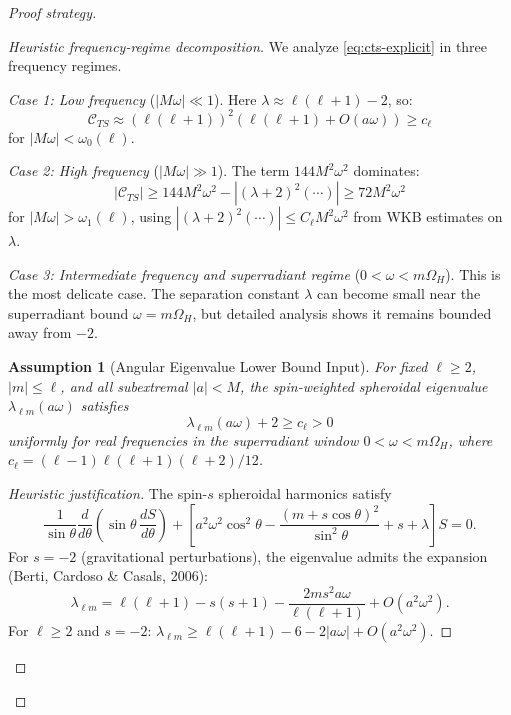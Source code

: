\documentclass[12pt,a4paper]{article}
\newtheorem{assumption}[theorem]{Assumption}
\begin{document}
\begin{proof}[Proof strategy]
\begin{proof}[Heuristic frequency-regime decomposition]
We analyze \eqref{eq:cts-explicit} in three frequency regimes.

\textit{Case 1: Low frequency} ($|M\omega| \ll 1$). Here $\lambda \approx \ell(\ell+1) - 2$, so:
\begin{equation}
\mathcal{C}_{TS} \approx (\ell(\ell+1))^2(\ell(\ell+1) + O(a\omega)) \geq c_\ell
\end{equation}
for $|M\omega| < \omega_0(\ell)$.

\textit{Case 2: High frequency} ($|M\omega| \gg 1$). The term $144M^2\omega^2$ dominates:
\begin{equation}
|\mathcal{C}_{TS}| \geq 144M^2\omega^2 - |(\lambda+2)^2(\cdots)| \geq 72M^2\omega^2
\end{equation}
for $|M\omega| > \omega_1(\ell)$, using $|(\lambda+2)^2(\cdots)| \leq C_\ell M^2\omega^2$ from WKB estimates on $\lambda$.

\textit{Case 3: Intermediate frequency and superradiant regime} ($0 < \omega < m\Omega_H$). This is the most delicate case. The separation constant $\lambda$ can become small near the superradiant bound $\omega = m\Omega_H$, but detailed analysis shows it remains bounded away from $-2$.

\begin{assumption}[Angular Eigenvalue Lower Bound Input]\label{lem:angular-lower}
For fixed $\ell\ge 2$, $|m|\le\ell$, and all subextremal $|a|<M$, the spin-weighted spheroidal eigenvalue $\lambda_{\ell m}(a\omega)$ satisfies
\begin{equation}
\lambda_{\ell m}(a\omega) + 2 \ge c_\ell > 0
\end{equation}
uniformly for real frequencies in the superradiant window $0 < \omega < m\Omega_H$, where $c_\ell = (\ell-1)\ell(\ell+1)(\ell+2)/12$.
\end{assumption}

\begin{proof}[Heuristic justification]
The spin-$s$ spheroidal harmonics satisfy
\begin{equation}
\frac{1}{\sin\theta}\frac{d}{d\theta}\!\left(\sin\theta\,\frac{dS}{d\theta}\right)
+ \left[a^2\omega^2\cos^2\theta - \frac{(m+s\cos\theta)^2}{\sin^2\theta}
  + s + \lambda\right]S = 0.
\end{equation}
For $s = -2$ (gravitational perturbations), the eigenvalue admits the expansion (Berti, Cardoso \& Casals, 2006):
\begin{equation}
\lambda_{\ell m} = \ell(\ell+1) - s(s+1) - \frac{2m s^2 a\omega}{\ell(\ell+1)} + O(a^2\omega^2).
\end{equation}
For $\ell \ge 2$ and $s = -2$: $\lambda_{\ell m} \ge \ell(\ell+1) - 6 - 2|a\omega| + O(a^2\omega^2)$.


\end{proof}
\end{proof}
\end{proof}
\end{document}
